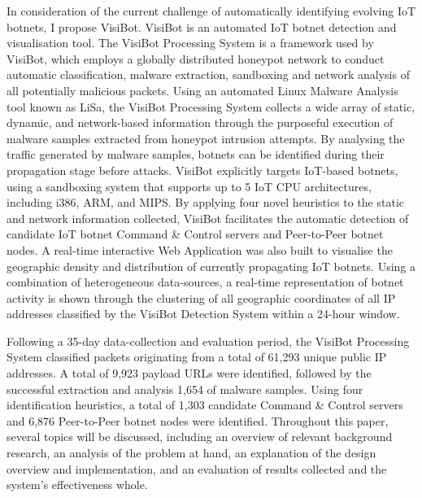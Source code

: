 In consideration of the current challenge of automatically identifying evolving IoT botnets, I propose VisiBot. VisiBot is an automated IoT botnet detection and visualisation tool. The VisiBot Processing System is a framework used by VisiBot, which employs a globally distributed honeypot network to conduct automatic classification, malware extraction, sandboxing and network analysis of all potentially malicious packets. Using an automated Linux Malware Analysis tool known as LiSa, \citep{LiSa} the VisiBot Processing System collects a wide array of static, dynamic, and network-based information through the purposeful execution of malware samples extracted from honeypot intrusion attempts. By analysing the traffic generated by malware samples, botnets can be identified during their propagation stage before attacks. VisiBot explicitly targets IoT-based botnets, using a sandboxing system that supports up to 5 IoT CPU architectures, including i386, ARM, and MIPS. By applying four novel heuristics to the static and network information collected, VisiBot facilitates the automatic detection of candidate IoT botnet Command \& Control servers and Peer-to-Peer botnet nodes. A real-time interactive Web Application was also built to visualise the geographic density and distribution of currently propagating IoT botnets. Using a combination of heterogeneous data-sources, a real-time representation of botnet activity is shown through the clustering of all geographic coordinates of all IP addresses classified by the VisiBot Detection System within a 24-hour window.

Following a 35-day data-collection and evaluation period, the VisiBot Processing System classified packets originating from a total of 61,293 unique public IP addresses. A total of 9,923 payload URLs were identified, followed by the successful extraction and analysis 1,654 of malware samples. Using four identification heuristics, a total of 1,303 candidate Command \& Control servers and 6,876 Peer-to-Peer botnet nodes were identified. Throughout this paper, several topics will be discussed, including an overview of relevant background research, an analysis of the problem at hand, an explanation of the design overview and implementation, and an evaluation of results collected and the system's effectiveness whole.
